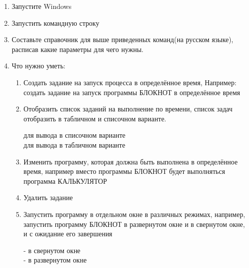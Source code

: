\documentclass[a4paper,12pt]{article}
\begin{document}
  \begin{flushleft}
    \begin{enumerate} [1. ]
     \item Запустите Windows
     \item Запустить командную строку
     \item Составьте справочник для выше приведенных команд(на русском языке), расписав какие параметры для чего нужны.
     \item Что нужно уметь:
      \begin{enumerate} [\bf a. ]
        \item Создать задание на запуск процесса в определённое время, Например: создать задание на запуск программы БЛОКНОТ в определённое время
        \begin{flushleft}
        \end{flushleft}
        \item Отобразить список заданий на выполнение по времени, список задач отобразить в табличном и списочном варианте.
        \begin{flushleft}
           для вывода в списочном варианте\\
           для вывода в табличном варианте
        \end{flushleft}
        \item Изменить программу, которая должна быть выполнена в определённое время, например вместо программы БЛОКНОТ будет выполняться программа КАЛЬКУЛЯТОР
        \begin{flushleft}
        \end{flushleft}
        \item Удалить задание
        \begin{flushleft}
        \end{flushleft}
        \item Запустить программу в отдельном окне в различных режимах, например, запустить программу БЛОКНОТ в развернутом окне и в свернутом окне, и с ожидание его завершения
        \begin{flushleft}
           - в свернутом окне\\
           - в развернутом окне\\

\end{flushleft}
\end{enumerate}
\end{enumerate}
\end{flushleft}
\end{document}
